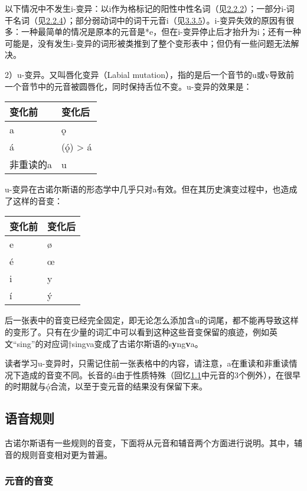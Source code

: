 以下情况中不发生i-变异：以i作为格标记的阳性中性名词（见\hyperref[ajawa-ux8bcdux5e72]{2.2.2}）；一部分i-词干名词（见\hyperref[_Ref115770706]{2.2.4}）；部分弱动词中的词干元音i（见\hyperref[ux7b2cux4e09ux5f31ux53d8ux4f4dux6cd5]{3.3.5}）。i-变异失效的原因有很多：一种最简单的情况是原本的元音是*e，但在i-变异停止后才抬升为i；还有一种可能是，没有发生i-变异的词形被类推到了整个变形表中；但仍有一些问题无法解决。

2）u-变异。又叫唇化变异（Labial
mutation），指的是后一个音节的u或v导致前一个音节中的元音被圆唇化，同时保持舌位不变。u-变异的效果是：

\begin{longtable}{ll}
\toprule
变化前 & 变化后 \\
\midrule
\endhead
\bottomrule
\endfoot
a & ǫ \\
á & (ǫ́) \textgreater{} á \\
非重读的a & u \\
\end{longtable}

u-变异在古诺尔斯语的形态学中几乎只对a有效。但在其历史演变过程中，也造成了这样的音变：

\begin{longtable}{ll}
\toprule
变化前 & 变化后 \\
\midrule
\endhead
\bottomrule
\endfoot
e & ø \\
é & œ \\
i & y \\
í & ý \\
\end{longtable}

后一张表中的音变已经完全固定，即无论怎么添加含u的词尾，都不能再导致这样的变形了。只有在少量的词汇中可以看到这种这些音变保留的痕迹，例如英文``sing''的对应词†singva变成了古诺尔斯语的s\textbf{y}ng\textbf{v}a。

读者学习u-变异时，只需记住前一张表格中的内容，请注意，a在重读和非重读情况下造成的音变不同。长音的á由于性质特殊（回忆\hyperref[ux4e66ux5199ux7cfbux7edfux548cux8bfbux97f3]{1.1}中元音的3个例外），在很早的时期就与ǫ́合流，以至于变元音的结果没有保留下来。

\subsection{语音规则}\label{ux8bedux97f3ux89c4ux5219}

古诺尔斯语有一些规则的音变，下面将从元音和辅音两个方面进行说明。其中，辅音的规则音变相对更为普遍。

\subsubsection{元音的音变}\label{ux5143ux97f3ux7684ux97f3ux53d8}

